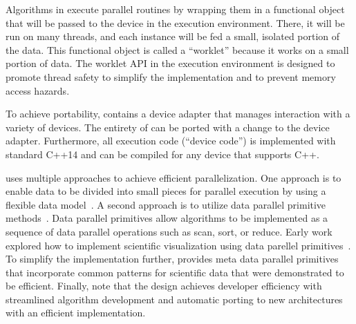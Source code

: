 Algorithms in \vtkm execute parallel routines by wrapping them in a functional object that will be passed to the device in the execution environment. There, it will be run on many threads, and each instance will be fed a small, isolated portion of the data.
This functional object is called a ``worklet'' because it works on a small portion of data.
The worklet API in the execution environment is designed to promote thread safety to simplify the implementation and to prevent memory access hazards.


To achieve portability, \vtkm contains a device adapter that manages interaction with a variety of devices.
The entirety of \vtkm can be ported with a change to the device adapter.
%
Furthermore, all execution code (``device code'') is implemented with standard C++14
and can be compiled for any device that supports C++.

\vtkm uses multiple approaches to achieve efficient parallelization.
One approach is 
to enable data to be divided into small pieces for parallel execution by
using a 
flexible data model~\citep{Meredith2012}.
A second approach is 
to utilize
data parallel primitive methods~\citep{Blelloch1990}.
Data parallel primitives allow algorithms to be implemented as a sequence of data parallel operations such as scan, sort, or reduce.
Early work explored how to implement scientific visualization using data parellel primitives~\citep{Lo2012}.
To simplify the implementation further, \vtkm provides meta data parallel primitives~\citep{Moreland2021} that incorporate common patterns for scientific data that were demonstrated to be efficient.
Finally, note that the \vtkm design achieves developer efficiency with 
streamlined algorithm development and 
automatic
porting to new architectures with an efficient implementation.
